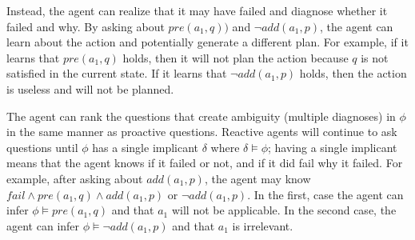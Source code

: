 \documentclass[letterpaper]{article}
\begin{document}
Instead, the agent can realize that it may have failed and diagnose whether it
failed and why.  By asking about $pre(a_1, q))$ and
$\neg add(a_1, p)$, the agent can learn about the action and potentially
generate a different plan.  For example, if it learns that $pre(a_1, q)$ holds,
then it will not plan the action because $q$ is not satisfied in the current
state.  If it learns that $\neg add(a_1, p)$ holds, then the action is useless
and will not be planned.

The agent can rank the questions that create ambiguity (multiple diagnoses) in
$\phi$ in the same manner as proactive questions.  Reactive agents will continue
to ask questions until $\phi$ has a single implicant $\delta$ where $\delta
\models \phi$; having a single implicant means that the agent knows if it failed
or not, and if it did fail why it failed.  For example, after asking about
$add(a_1, p)$, the agent may know $fail \wedge pre(a_1, q) \wedge
add(a_1, p)$ or $\neg add(a_1, p)$.  In the first, case the agent can infer
$\phi \models pre(a_1, q)$ and that $a_1$ will not be applicable.  In the second
case, the agent can infer $\phi \models \neg add(a_1, p)$ and that $a_1$ is
irrelevant.


% 
\end{document}
